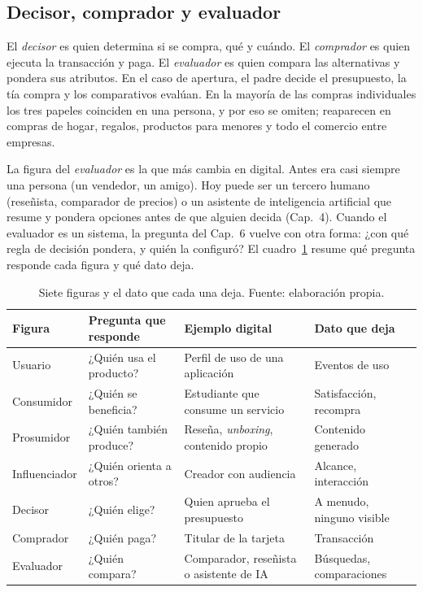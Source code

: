 \subsection{Decisor, comprador y evaluador}

El \emph{decisor} es quien determina si se compra, qué y cuándo. El
\emph{comprador} es quien ejecuta la transacción y paga. El \emph{evaluador}
es quien compara las alternativas y pondera sus atributos. En el caso de
apertura, el padre decide el presupuesto, la tía compra y los comparativos
evalúan. En la mayoría de las compras individuales los tres papeles
coinciden en una persona, y por eso se omiten; reaparecen en compras de
hogar, regalos, productos para menores y todo el comercio entre empresas.

La figura del \emph{evaluador} es la que más cambia en digital. Antes era
casi siempre una persona (un vendedor, un amigo). Hoy puede ser un tercero
humano (reseñista, comparador de precios) o un asistente de inteligencia
artificial que resume y pondera opciones antes de que alguien decida
(Cap.~4). Cuando el evaluador es un sistema, la pregunta del
Cap.~6 vuelve con otra forma: ¿con qué regla de decisión pondera, y quién la
configuró? El cuadro~\ref{tab:cap08-roles} resume qué pregunta responde cada
figura y qué dato deja.

\begin{table}[!htb]
\centering
\begin{tabular}{@{}p{2.3cm}p{3.7cm}p{3.5cm}p{2.9cm}@{}}
\toprule
Figura & Pregunta que responde & Ejemplo digital & Dato que deja \\
\midrule
Usuario & ¿Quién usa el producto? & Perfil de uso de una aplicación & Eventos de uso \\
Consumidor & ¿Quién se beneficia? & Estudiante que consume un servicio & Satisfacción, recompra \\
Prosumidor & ¿Quién también produce? & Reseña, \textit{unboxing}, contenido propio & Contenido generado \\
Influenciador & ¿Quién orienta a otros? & Creador con audiencia & Alcance, interacción \\
Decisor & ¿Quién elige? & Quien aprueba el presupuesto & A menudo, ninguno visible \\
Comprador & ¿Quién paga? & Titular de la tarjeta & Transacción \\
Evaluador & ¿Quién compara? & Comparador, reseñista o asistente de IA & Búsquedas, comparaciones \\
\bottomrule
\end{tabular}
\caption{Siete figuras y el dato que cada una deja. Fuente: elaboración propia.}
\label{tab:cap08-roles}
\end{table}

